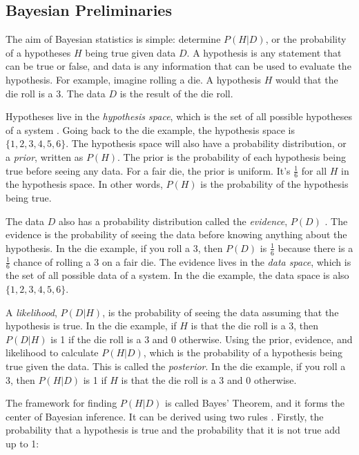 \documentclass[preprint,longauthor]{aastex631}
\numberwithin{equation}{section}
\begin{document}
\subsection{Bayesian Preliminaries} %
The aim of Bayesian statistics is simple: determine $P(H|D)$, or the probability of a hypotheses $H$ being true given data $D$. A hypothesis is any statement that can be true or false, and data is any information that can be used to evaluate the hypothesis. For example, imagine rolling a die. A hypothesis $H$ would that the die roll is a 3. The data $D$ is the result of the die roll.

Hypotheses live in the \textit{hypothesis space}, which is the set of all possible hypotheses of a system \citep{brewer1BayesianInference2018}. Going back to the die example, the hypothesis space is $\{1,2,3,4,5,6\}$. The hypothesis space will also have a probability distribution, or a \textit{prior}, written as $P(H)$. The prior is the probability of each hypothesis being true before seeing any data. For a fair die, the prior is uniform. It's $\frac{1}{6}$ for all $H$ in the hypothesis space. In other words, $P(H)$ is the probability of the hypothesis being true.

The data $D$ also has a probability distribution called the \textit{evidence}, $P(D)$ \citep{brewer1BayesianInference2018}. The evidence is the probability of seeing the data before knowing anything about the hypothesis. In the die example, if you roll a 3, then $P(D)$ is $\frac{1}{6}$ because there is a $\frac{1}{6}$ chance of rolling a 3 on a fair die. The evidence lives in the \textit{data space}, which is the set of all possible data of a system. In the die example, the data space is also $\{1,2,3,4,5,6\}$.

A \textit{likelihood}, $P(D|H)$, is the probability of seeing the data assuming that the hypothesis is true. In the die example, if $H$ is that the die roll is a 3, then $P(D|H)$ is 1 if the die roll is a 3 and 0 otherwise. Using the prior, evidence, and likelihood to calculate $P(H|D)$, which is the probability of a hypothesis being true given the data. This is called the \textit{posterior}. In the die example, if you roll a 3, then $P(H|D)$ is 1 if $H$ is that the die roll is a 3 and 0 otherwise.

The framework for finding $P(H|D)$ is called Bayes' Theorem, and it forms the center of Bayesian inference. It can be derived using two rules \citep{coxProbabilityFrequencyReasonable1946}. Firstly, the probability that a hypothesis is true and the probability that it is not true add up to 1:
\end{document}
